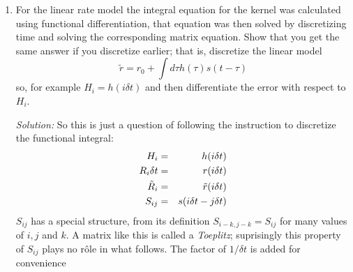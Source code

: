 \documentclass[12pt]{article}
\newcommand\soln{\noindent\textit{Solution:} }
\begin{document}
\begin{enumerate}
\soln The point being made here is that the spike rate is a smoothing of the spike train and this isn't always needed, since the spike train is smoothed anyway:
\begin{equation}
Q_{\mbox{\scriptsize{rs}}}(\tau)=\int dt r(\tau')s(\tau-\tau')
\end{equation}
and so
\begin{equation}
Q_{\mbox{\scriptsize{rs}}}(\tau)=\left<\int dt \rho(\tau'-t)k(t)  s(\tau-\tau')\right>=\int dt k(t) \int dt \left<\rho(\tau'-t)\right> s(\tau-\tau')
\end{equation}
so if
\begin{equation}
q_{\mbox{\scriptsize{rs}}}(\tau)=\int dt \left<\rho(\tau')\right>s(\tau-\tau')
\end{equation}
then
\begin{equation}
Q_{\mbox{\scriptsize{rs}}}(\tau)=\int dt k(t) q_{\mbox{\scriptsize{rs}}}(\tau-t)
\end{equation}
and so the original smoothing kernel applied to spike trains acts as a
smoothing kernel on the stimulus-response correllation function, something
that might not need smoothing since the stimulus will smooth it anyway.




\item For the linear rate model the integral equation for the kernel
  was calculated using functional differentiation, that equation was
  then solved by discretizing time and solving the corresponding
  matrix equation. Show that you get the same answer if you discretize
  earlier; that is, discretize the linear model
\begin{equation}
\tilde{r}=r_0+\int{d\tau h(\tau) s(t-\tau)}
\end{equation}
so, for example $H_i=h(i\delta t)$ and then differentiate the error with respect to $H_i$.

\soln So this is just a question of following the instruction to discretize the functional integral:
\begin{eqnarray}
H_i&=&h(i\delta t)\cr
R_i\delta t&=&r(i\delta t)\cr
\tilde{R}_i&=&\tilde{r}(i\delta t)\cr
S_{ij}&=&s(i\delta t-j\delta t)
\end{eqnarray}
$S_{ij}$ has a special structure, from its definition
$S_{i-k,j-k}=S_{ij}$ for many values of $i,j$ and $k$. A matrix like
this is called a {\sl Toeplitz}; suprisingly this property of $S_{ij}$
plays no r\^{o}le in what follows. The factor of $1/\delta t$ is added for convenience 


\end{enumerate}
\end{document}
